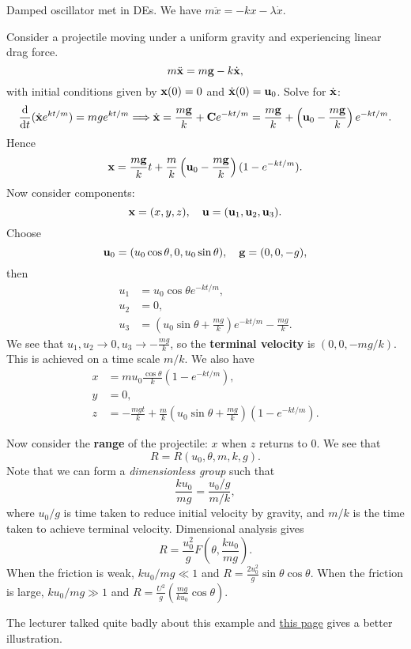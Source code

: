 \begin{example}
    Damped oscillator met in DEs. We have $ m \ddot{x} = -kx - \lambda \dot{x} $.
\end{example}
\begin{example}
    Consider a projectile moving under a uniform gravity and experiencing linear drag force.
    \[
        m \ddot{{\bf x}} = m{\bf g} -k \dot{{\bf x}},
    \]
    with initial conditions given by $ {\bf x}(0) = 0 $ and $ \dot{{\bf x}}(0)={\bf u}_0 $. Solve for $ \dot{{\bf x}} $:
    \[
        \frac{\mathrm{d}}{\mathrm{d}t} (\dot{{\bf x}} e^{kt/m})=mge^{kt/m} \Longrightarrow \dot{{\bf x}} = \frac{m{\bf g}}{k}+{\bf C} e^{-kt/m} = \frac{m{\bf g}}{k}+\left( {\bf u}_0-\frac{m{\bf g}}{k} \right)e^{-kt/m}.
    \]
    Hence 
    \[
        {\bf x} = \frac{m{\bf g}}{k}t+\frac{m}{k}\left( {\bf u}_0-\frac{m{\bf g}}{k} \right)(1-e^{-kt/m}).
    \]
    Now consider components:
    \[
        {\bf x}=(x,y,z),\quad {\bf u}= ({\bf u}_1,{\bf u}_2,{\bf u}_3).
    \]
    Choose
    \[
        {\bf u}_0 = (u_0 \cos \theta,0,u_0 \sin \theta),\quad {\bf g} = (0,0,-g),
    \]
    then
    \begin{align*}
        u_1 &= u_0 \cos \theta e^{-kt/m},\\ 
        u_2 &= 0,\\
        u_3 &= \left( u_0\sin \theta+\frac{mg}{k} \right)e^{-kt/m}-\frac{mg}{k}.
    \end{align*}
    We see that $ u_1,u_2\to 0,u_3\to -\frac{mg}{k} $, so the \textbf{terminal velocity} is $ (0,0,-mg/k) $. This is achieved on a time scale $ m/k $. We also have 
    \begin{align*}
        x&= m u_0\frac{\cos \theta}{k}(1-e^{-kt/m}),\\ 
        y&= 0,\\ 
        z&= -\frac{mgt}{k}+\frac{m}{k}\left( u_0 \sin \theta+\frac{mg}{k} \right)(1-e^{-kt/m}).
    \end{align*}

    Now consider the \textbf{range} of the projectile: $x$ when $z$ returns to 0. We see that 
    \[
        R = R(u_0,\theta,m,k,g).
    \]
    Note that we can form a \textit{dimensionless group} such that 
    \[
        \frac{ku_0}{mg} = \frac{u_0/g}{m/k},
    \]
    where $u_0/g$ is time taken to reduce initial velocity by gravity, and $m/k$ is the time taken to achieve terminal velocity. Dimensional analysis gives 
    \[
        R = \frac{u_0^2}{g}F\left( \theta,\frac{ku_0}{mg} \right).
    \] 
    When the friction is weak, $ ku_0/mg\ll 1 $ and $ R = \frac{2u_0^2}{g}\sin \theta \cos \theta  $. When the friction is large, $ ku_0/mg\gg 1 $ and $ R=\frac{U^2}{g}\left( \frac{mg}{ku_0}\cos \theta \right) $.
\end{example}
The lecturer talked quite badly about this example and \href{http://www.damtp.cam.ac.uk/user/tong/relativity/two.pdf\#page=27}{this page} gives a better illustration.

